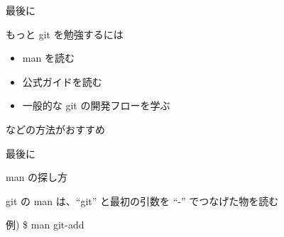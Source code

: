 
\begin{frame}[t]{最後に}{}

  もっと git を勉強するには
  \vspace{2ex}

  \begin{itemize}
  \item man を読む
  \item 公式ガイドを読む
  \item 一般的な git の開発フローを学ぶ
  \end{itemize}
  \vspace{2ex}

  などの方法がおすすめ

\end{frame}

\begin{frame}[t]{最後に}{}

  man の探し方
  \vspace{2ex}

  git の man は、``git'' と最初の引数を ``-'' でつなげた物を読む

  例) \$ man git-add
  \vspace{2ex}

  \vspace{2ex}

\end{frame}


